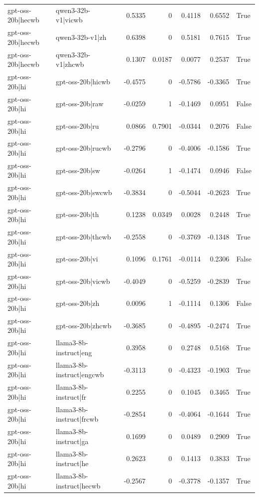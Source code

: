 \begin{table}
\begin{tabular}{l l r r r r l}
gpt-oss-20b|hecwb & qwen3-32b-v1|vicwb & 0.5335 & 0 & 0.4118 & 0.6552 & True \\
gpt-oss-20b|hecwb & qwen3-32b-v1|zh & 0.6398 & 0 & 0.5181 & 0.7615 & True \\
gpt-oss-20b|hecwb & qwen3-32b-v1|zhcwb & 0.1307 & 0.0187 & 0.0077 & 0.2537 & True \\
gpt-oss-20b|hi & gpt-oss-20b|hicwb & -0.4575 & 0 & -0.5786 & -0.3365 & True \\
gpt-oss-20b|hi & gpt-oss-20b|raw & -0.0259 & 1 & -0.1469 & 0.0951 & False \\
gpt-oss-20b|hi & gpt-oss-20b|ru & 0.0866 & 0.7901 & -0.0344 & 0.2076 & False \\
gpt-oss-20b|hi & gpt-oss-20b|rucwb & -0.2796 & 0 & -0.4006 & -0.1586 & True \\
gpt-oss-20b|hi & gpt-oss-20b|sw & -0.0264 & 1 & -0.1474 & 0.0946 & False \\
gpt-oss-20b|hi & gpt-oss-20b|swcwb & -0.3834 & 0 & -0.5044 & -0.2623 & True \\
gpt-oss-20b|hi & gpt-oss-20b|th & 0.1238 & 0.0349 & 0.0028 & 0.2448 & True \\
gpt-oss-20b|hi & gpt-oss-20b|thcwb & -0.2558 & 0 & -0.3769 & -0.1348 & True \\
gpt-oss-20b|hi & gpt-oss-20b|vi & 0.1096 & 0.1761 & -0.0114 & 0.2306 & False \\
gpt-oss-20b|hi & gpt-oss-20b|vicwb & -0.4049 & 0 & -0.5259 & -0.2839 & True \\
gpt-oss-20b|hi & gpt-oss-20b|zh & 0.0096 & 1 & -0.1114 & 0.1306 & False \\
gpt-oss-20b|hi & gpt-oss-20b|zhcwb & -0.3685 & 0 & -0.4895 & -0.2474 & True \\
gpt-oss-20b|hi & llama3-8b-instruct|eng & 0.3958 & 0 & 0.2748 & 0.5168 & True \\
gpt-oss-20b|hi & llama3-8b-instruct|engcwb & -0.3113 & 0 & -0.4323 & -0.1903 & True \\
gpt-oss-20b|hi & llama3-8b-instruct|fr & 0.2255 & 0 & 0.1045 & 0.3465 & True \\
gpt-oss-20b|hi & llama3-8b-instruct|frcwb & -0.2854 & 0 & -0.4064 & -0.1644 & True \\
gpt-oss-20b|hi & llama3-8b-instruct|ga & 0.1699 & 0 & 0.0489 & 0.2909 & True \\
gpt-oss-20b|hi & llama3-8b-instruct|he & 0.2623 & 0 & 0.1413 & 0.3833 & True \\
gpt-oss-20b|hi & llama3-8b-instruct|hecwb & -0.2567 & 0 & -0.3778 & -0.1357 & True \\

\end{tabular}
\end{table}
